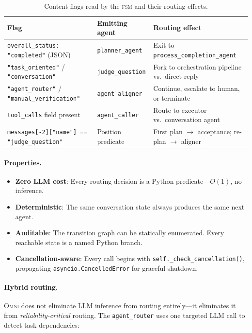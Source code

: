 \documentclass[11pt,a4paper]{article}
\newcommand{\omni}{\textsc{Omni}}
\newcommand{\fsm}{\textsc{fsm}}
\begin{document}
\begin{table}[h]
\centering
\caption{Content flags read by the \fsm{} and their routing effects.}
\label{tab:content_flags}
\small
\begin{tabular}{lll}
\toprule
\textbf{Flag} & \textbf{Emitting agent} & \textbf{Routing effect} \\
\midrule
\texttt{overall\_status: "completed"} (JSON) & \texttt{planner\_agent} & Exit to \texttt{process\_completion\_agent} \\
\texttt{"task\_oriented"} / \texttt{"conversation"} & \texttt{judge\_question} & Fork to orchestration pipeline vs.\ direct reply \\
\texttt{"agent\_router"} / \texttt{"manual\_verification"} & \texttt{agent\_aligner} & Continue, escalate to human, or terminate \\
\texttt{tool\_calls} field present & \texttt{agent\_caller} & Route to executor vs.\ conversation agent \\
\texttt{messages[-2]["name"] == "judge\_question"} & Position predicate & First plan $\to$ acceptance; re-plan $\to$ aligner \\
\bottomrule
\end{tabular}
\end{table}

\paragraph{Properties.}
\begin{itemize}[topsep=2pt, itemsep=1pt]
  \item \textbf{Zero LLM cost}: Every routing decision is a Python predicate---$O(1)$, no inference.
  \item \textbf{Deterministic}: The same conversation state always produces the same next agent.
  \item \textbf{Auditable}: The transition graph can be statically enumerated. Every reachable state is a named Python branch.
  \item \textbf{Cancellation-aware}: Every call begins with \texttt{self.\_check\_cancellation()}, propagating \texttt{asyncio.CancelledError} for graceful shutdown.
\end{itemize}

\paragraph{Hybrid routing.} \omni{} does not eliminate LLM inference from routing entirely---it eliminates it from \emph{reliability-critical} routing. The \texttt{agent\_router} uses one targeted LLM call to detect task dependencies:
\end{document}
